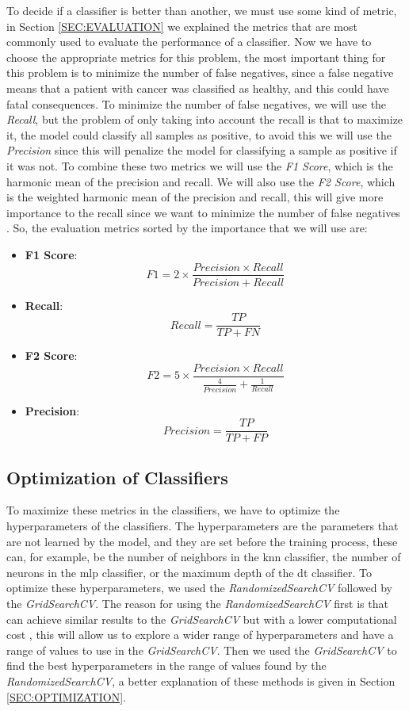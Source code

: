 To decide if a classifier is better than another, we must use some kind of metric, in Section \ref{SEC:EVALUATION} we explained the metrics that are most commonly used to evaluate the performance of a classifier. Now we have to choose the appropriate metrics for this problem, the most important thing for this problem is to minimize the number of false negatives, since a false negative means that a patient with cancer was classified as healthy, and this could have fatal consequences. To minimize the number of false negatives, we will use the \textit{Recall}, but the problem of only taking into account the recall is that to maximize it, the model could classify all samples as positive, to avoid this we will use the \textit{Precision} since this will penalize the model for classifying a sample as positive if it was not. To combine these two metrics we will use the \textit{F1 Score}, which is the harmonic mean of the precision and recall. We will also use the \textit{F2 Score}, which is the weighted harmonic mean of the precision and recall, this will give more importance to the recall since we want to minimize the number of false negatives \cite{rutecki_best_nodate}. So, the evaluation metrics sorted by the importance that we will use are:

\begin{itemize}
    \item \textbf{F1 Score}: $$F1 = 2 \times \frac{Precision \times Recall}{Precision + Recall}$$
    \item \textbf{Recall}: $$Recall = \frac{TP}{TP + FN}$$
    \item \textbf{F2 Score}: $$F2 = 5 \times \frac{Precision \times Recall}{\frac{4}{Precision} + \frac{1}{Recall}}$$
    \item \textbf{Precision}: $$Precision = \frac{TP}{TP + FP}$$
\end{itemize}

\subsection{Optimization of Classifiers}

To maximize these metrics in the classifiers, we have to optimize the hyperparameters of the classifiers. The hyperparameters are the parameters that are not learned by the model, and they are set before the training process, these can, for example, be the number of neighbors in the \ac{knn} classifier, the number of neurons in the \ac{mlp} classifier, or the maximum depth of the \ac{dt} classifier. To optimize these hyperparameters, we used the \textit{RandomizedSearchCV} followed by the \textit{GridSearchCV}. The reason for using the \textit{RandomizedSearchCV} first is that can achieve similar results to the \textit{GridSearchCV} but with a lower computational cost \cite{bergstra_random_nodate}, this will allow us to explore a wider range of hyperparameters and have a range of values to use in the \textit{GridSearchCV}. Then we used the \textit{GridSearchCV} to find the best hyperparameters in the range of values found by the \textit{RandomizedSearchCV}, a better explanation of these methods is given in Section \ref{SEC:OPTIMIZATION}.

